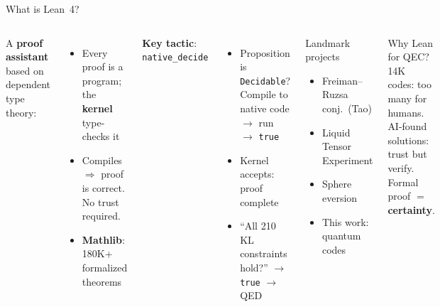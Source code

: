 \documentclass[aspectratio=169,t]{beamer}
\newcommand{\code}[1]{\texttt{\small #1}}
\begin{document}
\begin{frame}{What is Lean~4?}

\begin{columns}[T]
A \textbf{proof assistant} based on dependent type theory:
\begin{itemize}\setlength\itemsep{0pt}
\item Every proof is a program; the \textbf{kernel} type-checks it
\item Compiles $\Rightarrow$ proof is correct.  No trust required.
\item \textbf{Mathlib}: 180K+ formalized theorems
\end{itemize}

\textbf{Key tactic}: \code{native\_decide}
\begin{itemize}\setlength\itemsep{0pt}
\item Proposition is \code{Decidable}?
  Compile to native code $\to$ run $\to$ \code{true}
\item Kernel accepts: proof complete
\item ``All 210 KL constraints hold?''
  $\to$ \code{true} $\to$ QED
\end{itemize}

\begin{exampleblock}{Landmark projects}
\begin{itemize}\setlength\itemsep{0pt}
\item Freiman--Ruzsa conj.\ (Tao)
\item Liquid Tensor Experiment
\item Sphere eversion
\item \alert{This work}: quantum codes
\end{itemize}
\end{exampleblock}

\begin{block}{Why Lean for QEC?}
14K codes: too many for humans.\\
AI-found solutions: trust but verify.\\
Formal proof $=$ \textbf{certainty}.
\end{block}
\end{columns}
\end{frame}
\end{document}
